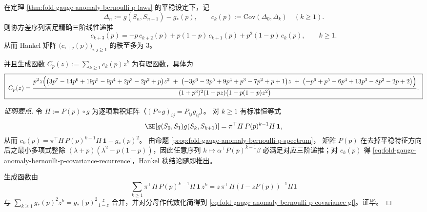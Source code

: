 \begin{proposition}\label{prop:fold-gauge-anomaly-bernoulli-p-covariance-recurrence}
在定理 \ref{thm:fold-gauge-anomaly-bernoulli-p-laws} 的平稳设定下，记
\[
\Delta_n:=g(S_n,S_{n+1})-g_\ast(p),
\qquad
c_k(p):=\mathrm{Cov}(\Delta_0,\Delta_k)\quad(k\ge 1).
\]
则协方差序列满足精确三阶线性递推
\begin{equation}\label{eq:fold-gauge-anomaly-bernoulli-p-covariance-recurrence}
c_{k+3}(p)
=-p\,c_{k+2}(p)+p(1-p)\,c_{k+1}(p)+p^2(1-p)\,c_k(p),
\qquad k\ge 1.
\end{equation}
从而 Hankel 矩阵 \(\bigl(c_{i+j}(p)\bigr)_{i,j\ge 1}\) 的秩至多为 \(3\)。
\par
并且生成函数 \(C_p(z):=\sum_{k\ge 1}c_k(p)z^k\) 为有理函数，具体为
\begin{equation}\label{eq:fold-gauge-anomaly-bernoulli-p-covariance-gf}
\boxed{\;
C_p(z)=
\frac{p^2 z\Bigl(
\bigl(3p^7-14p^6+19p^5-9p^4+2p^3-2p^2+p\bigr)z^2
\;+\;\bigl(-3p^6-2p^5+9p^4+p^3-7p^2+p+1\bigr)z
\;+\;\bigl(-p^6+p^5-6p^4+13p^3-8p^2-2p+2\bigr)
\Bigr)}{(1+p^3)^2 (1+p z)\bigl(1-p(1-p) z^2\bigr)}.\;}
\end{equation}
\end{proposition}
\begin{proof}[证明要点]
令 \(H:=P(p)\circ g\) 为逐项乘积矩阵（\((P\circ g)_{ij}=P_{ij}g_{ij}\)）。
对 \(k\ge 1\) 有标准恒等式
\[
\EE[g(S_0,S_1)g(S_k,S_{k+1})]=\pi^\top H\,P(p)^{k-1}H\,\mathbf 1,
\]
从而
\(
c_k(p)=\pi^\top H\,P(p)^{k-1}H\,\mathbf 1-g_\ast(p)^2
\)。
由命题 \ref{prop:fold-gauge-anomaly-bernoulli-p-spectrum}，
矩阵 \(P(p)\) 在去掉平稳特征方向后之最小多项式整除 \((\lambda+p)(\lambda^2-p(1-p))\)，因此任意序列 \(k\mapsto \alpha^\top P(p)^{k-1}\beta\) 必满足对应三阶递推；对 \(c_k(p)\) 得 \eqref{eq:fold-gauge-anomaly-bernoulli-p-covariance-recurrence}，Hankel 秩结论随即推出。
\par
生成函数由
\[
\sum_{k\ge 1}\pi^\top H\,P(p)^{k-1}H\,\mathbf 1\,z^k
=z\,\pi^\top H(I-zP(p))^{-1}H\mathbf 1
\]
与 \(\sum_{k\ge 1}g_\ast(p)^2z^k=g_\ast(p)^2\frac{z}{1-z}\) 合并，并对分母作代数化简得到 \eqref{eq:fold-gauge-anomaly-bernoulli-p-covariance-gf}。证毕。
\end{proof}
